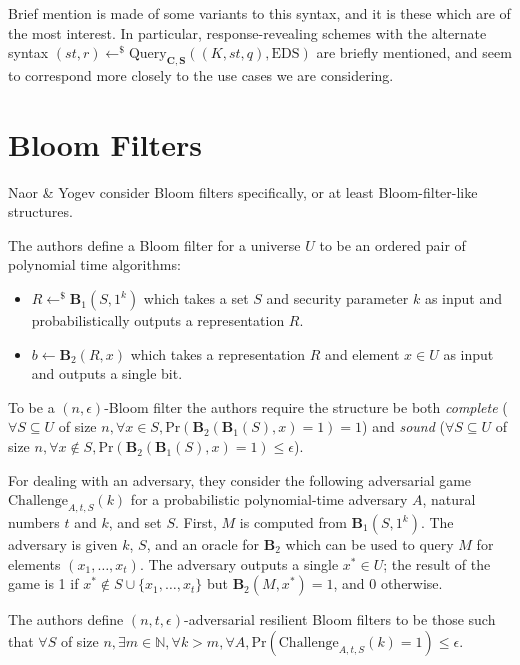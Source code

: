\documentclass[11pt, pdftex]{article}
\begin{document}
Brief mention is made of some variants to this syntax, and it is these which are of the most interest. In particular, response-revealing schemes with the alternate syntax $(st,r) \gets^\$ \mathrm{Query}_{\mathbf{C},\mathbf{S}}((K,st,q),\mathrm{EDS})$ are briefly mentioned, and seem to correspond more closely to the use cases we are considering.

\section{Bloom Filters}

Naor \& Yogev \cite{bf} consider Bloom filters specifically, or at least Bloom-filter-like structures.

The authors define a Bloom filter for a universe $U$ to be an ordered pair of polynomial time algorithms:

\begin{itemize}
	\item $R \gets^\$ \mathbf{B}_1(S,1^k)$ which takes a set $S$ and security parameter $k$ as input and probabilistically outputs a representation $R$.
	\item $b \gets \mathbf{B}_2(R,x)$ which takes a representation $R$ and element $x \in U$ as input and outputs a single bit.
\end{itemize}

To be a $(n,\epsilon)$-Bloom filter the authors require the structure be both {\em complete} ($\forall S \subseteq U$ of size $n, \forall x \in S, \mathrm{Pr}(\mathbf{B}_2(\mathbf{B}_1(S),x) = 1) = 1$) and {\em sound} ($\forall S \subseteq U$ of size $n, \forall x \not\in S, \mathrm{Pr}(\mathbf{B}_2(\mathbf{B}_1(S),x) = 1) \le \epsilon$).

For dealing with an adversary, they consider the following adversarial game $\mathrm{Challenge}_{A,t,S}(k)$ for a probabilistic polynomial-time adversary $A$, natural numbers $t$ and $k$, and set $S$. First, $M$ is computed from $\mathbf{B}_1(S,1^k)$. The adversary is given $k$, $S$, and an oracle for $\mathbf{B}_2$ which can be used to query $M$ for elements $(x_1,\ldots,x_t)$. The adversary outputs a single $x^* \in U$; the result of the game is 1 if $x^* \not\in S \cup \{x_1,\ldots,x_t\}$ but $\mathbf{B}_2(M,x^*) = 1$, and 0 otherwise.

The authors define $(n,t,\epsilon)$-adversarial resilient Bloom filters to be those such that $\forall S$ of size $n, \exists m \in \mathbb{N}, \forall k > m, \forall A, \mathrm{Pr}(\mathrm{Challenge}_{A,t,S}(k) = 1) \le \epsilon$.
\end{document}
